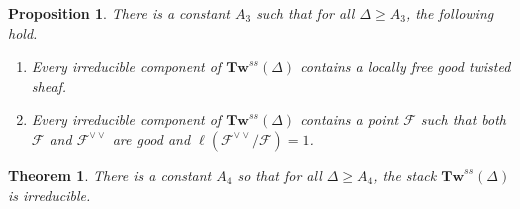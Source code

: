 \documentclass[11pt]{amsart}
\newcommand{\ms}[1]{\mathscr #1}
\renewcommand{\[}{[\!\hspace{0.03em}[}
\renewcommand{\]}{]\!\hspace{0.03em}]}
\renewcommand{\(}{(\!\hspace{0.03em}(}
\renewcommand{\)}{)\!\hspace{0.03em})}
\newcommand{\Tw}{\mathbf{Tw}}
\newtheorem{thm}[lem]{Theorem}
\newtheorem{prop}[lem]{Proposition}
\theoremstyle{definition}
\theoremstyle{remark}
\begin{document}
\begin{prop}\label{P:refined generic smoothness} There is a 
constant $A_{3}$ such that for all $\Delta\geq A_{3}$, the following 
hold.
\begin{enumerate}
    \item[(1)] Every irreducible component of $\Tw^{ss}(\Delta)$ 
    contains a locally free good twisted sheaf.

    \item[(2)] Every irreducible component of $\Tw^{ss}(\Delta)$ 
    contains a point $\ms F$ such that both $\ms F$ and $\ms 
    F^{\vee\vee}$ are good and $\ell(\ms F^{\vee\vee}/\ms F)=1$.
\end{enumerate}
\end{prop}

\begin{thm}\label{T:irred} There is a constant $A_{4}$ so that for 
all $\Delta\geq A_{4}$, the stack $\Tw^{ss}(\Delta)$ is irreducible.
\end{thm}
\end{document}
